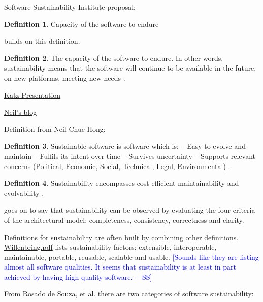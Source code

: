 \documentclass[letterpaper,cleveref]{lipics-v2019}
\newcommand{\authornote}[3]{\textcolor{#1}{[#3 ---#2]}}
\newcommand{\authornote}[3]{}
\newcommand{\wss}[1]{\authornote{blue}{SS}{#1}} %
\theoremstyle{definition}
\newtheorem{defn}{Definition}
\begin{document}
Software Sustainability Institute proposal:

\begin{defn}
Capacity of the software to endure
\end{defn}

\citet{Katz2016} builds on this definition.

\begin{defn}
  \noindent The capacity of the software to endure. In other words,
  sustainability means that the software will continue to be available in the
  future, on new platforms, meeting new needs \citep{Katz2016}.
\end{defn}

\href{https://collegeville.github.io/CW3S19/WorkshopResources/Presentations/4-5-Katz_data-driven-software-sustainability.pdf}
{Katz Presentation}

\href{https://www.software.ac.uk/blog/2019-09-12-making-open-source-research-software-visible-path-better-sustainability}
{Neil's blog}

Definition from Neil Chue Hong:
\begin{defn}
	Sustainable software is software which is:
	-- Easy to evolve and maintain
	-- Fulfils its intent over time
	-- Survives uncertainty
	-- Supports relevant concerns (Political, Economic, Social, Technical,
	Legal, Environmental) \citep{Katz2016}.
\end{defn}

\begin{defn}
Sustainability encompasses cost efficient maintainability and evolvability \citep{SehestedtEtAl2014}.
\end{defn}

\citet{SehestedtEtAl2014} goes on to say that sustainability can be observed by
evaluating the four criteria of the architectural model: completeness,
consistency, correctness and clarity.

Definitions for sustainability are often built by combining other definitions.
\href{https://collegeville.github.io/CW3S19/WorkshopResources/Presentations/1-4-2019CollegevilleWorkshopWillenbring.pdf}
{Willenbring.pdf}
lists sustainability factors: extensible, interoperable, maintainable, portable,
reusable, scalable and usable.  \wss{Sounds like they are listing almost all
  software qualities.  It seems that sustainability is at least in part achieved
  by having high quality software.}

From
\href{https://figshare.com/articles/Defining_Sustainability_through_Developers_Eyes_Recommendations_from_an_Interview_Study/1111925/1}
{Rosado de Souza, et al.} there are two categories of software sustainability:
\end{document}
